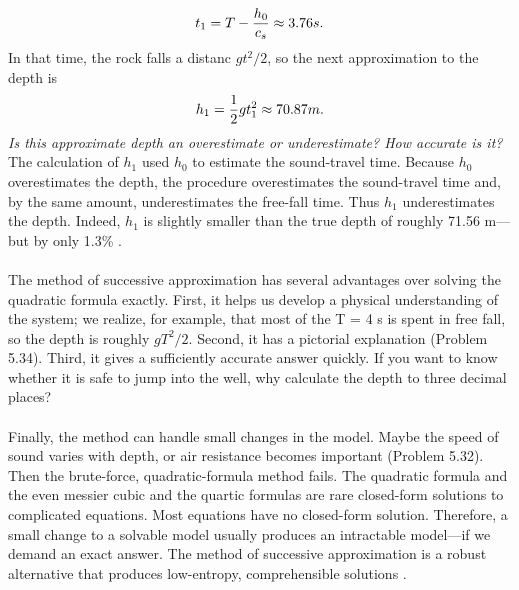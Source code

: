 \documentclass[fleqn]{book}
\newcounter{pro1}
\begin{document}
 
\pagestyle{fancy} 

\renewcommand{\headrulewidth}{0pt}
\fancyhf{} %

\Large
\begin{equation} 
\Large t_{1}=T-\frac{h_{0}}{c_{s}}\approx 3.76s.
\end{equation} 
\Large \textrm{In that time, the rock falls a distanc $gt^{2}/2$, so the next approximation to the depth is} 
\begin{equation}
\Large h_{1}=\frac{1}{2}gt_{1}^{2}\approx 70.87m.
\end{equation} 
 \large\textsl{Is this approximate depth an overestimate or underestimate? How accurate is it?} \\ 
\Large \textrm{The calculation of $h_{1}$ used $h_{0}$ to estimate the sound-travel time. Because 
$h_{0}$ overestimates the depth, the procedure overestimates the sound-travel 
time and, by the same amount, underestimates the free-fall time. Thus 
$h_{1}$  underestimates the depth. Indeed, $h_{1}$ is slightly smaller than the true 
depth of roughly 71.56 m—but by only 1.3\% .} \\ 
\\
\Large\textrm{The method of successive approximation has several advantages over solving the quadratic formula exactly. First, it helps us develop a physical 
understanding of the system; we realize, for example, that most of the 
T = 4 s is spent in free fall, so the depth is roughly $gT^{2}/2$. Second, it 
has a pictorial explanation (Problem 5.34). Third, it gives a sufficiently 
accurate answer quickly. If you want to know whether it is safe to jump 
into the well, why calculate the depth to three decimal places?} \\ 
\\
\Large\textrm{Finally, the method can handle small changes in the model. Maybe the 
speed of sound varies with depth, or air resistance becomes important 
(Problem 5.32). Then the brute-force, quadratic-formula method fails. The 
quadratic formula and the even messier cubic and the quartic formulas 
are rare closed-form solutions to complicated equations. Most equations 
have no closed-form solution. Therefore, a small change to a solvable 
model usually produces an intractable model—if we demand an exact 
answer. The method of successive approximation is a robust alternative 
that produces low-entropy, comprehensible solutions .} \\ 
\end{document}
